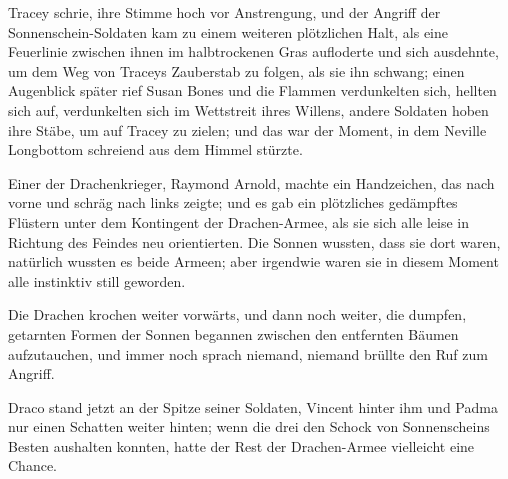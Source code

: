 Tracey schrie, ihre Stimme hoch vor Anstrengung,  und der Angriff der Sonnenschein-Soldaten kam zu einem weiteren plötzlichen Halt, als eine Feuerlinie zwischen ihnen im halbtrockenen Gras aufloderte und sich ausdehnte, um dem Weg von Traceys Zauberstab zu folgen, als sie ihn schwang; einen Augenblick später rief Susan Bones  und die Flammen verdunkelten sich, hellten sich auf, verdunkelten sich im Wettstreit ihres Willens, andere Soldaten hoben ihre Stäbe, um auf Tracey zu zielen; und das war der Moment, in dem Neville Longbottom schreiend aus dem Himmel stürzte.

\later

Einer der Drachenkrieger, Raymond Arnold, machte ein Handzeichen, das nach vorne und schräg nach links zeigte; und es gab ein plötzliches gedämpftes Flüstern unter dem Kontingent der Drachen-Armee, als sie sich alle leise in Richtung des Feindes neu orientierten. Die Sonnen wussten, dass sie dort waren, natürlich wussten es beide Armeen; aber irgendwie waren sie in diesem Moment alle instinktiv still geworden.

Die Drachen krochen weiter vorwärts, und dann noch weiter, die dumpfen, getarnten Formen der Sonnen begannen zwischen den entfernten Bäumen aufzutauchen, und immer noch sprach niemand, niemand brüllte den Ruf zum Angriff.

Draco stand jetzt an der Spitze seiner Soldaten, Vincent hinter ihm und Padma nur einen Schatten weiter hinten; wenn die drei den Schock von Sonnenscheins Besten aushalten konnten, hatte der Rest der Drachen-Armee vielleicht eine Chance.

